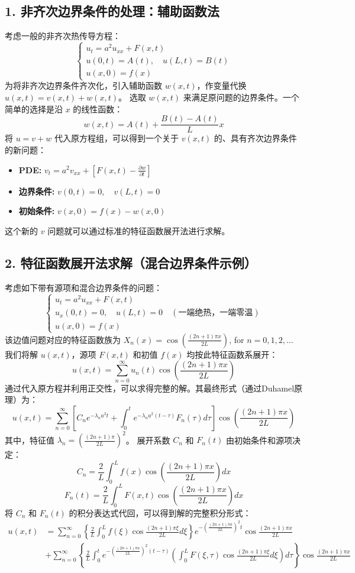 \documentclass{article}
\begin{document}
	\subsection*{1. 非齐次边界条件的处理：辅助函数法}
	考虑一般的非齐次热传导方程：
	\[
	\begin{cases}
		u_t = a^2 u_{xx} + F(x,t) \\
		u(0,t) = A(t), \quad u(L,t) = B(t) \\
		u(x,0) = f(x)
	\end{cases}
	\]
	为将非齐次边界条件齐次化，引入辅助函数 $w(x,t)$，作变量代换 $u(x,t) = v(x,t) + w(x,t)$。
	选取 $w(x,t)$ 来满足原问题的边界条件。一个简单的选择是沿 $x$ 的线性函数：
	\[
	w(x,t) = A(t) + \frac{B(t) - A(t)}{L} x
	\]
	将 $u = v+w$ 代入原方程组，可以得到一个关于 $v(x,t)$ 的、具有齐次边界条件的新问题：
	\begin{itemize}
		\item \textbf{PDE:} $v_t = a^2 v_{xx} + \left[ F(x,t) - \frac{\partial w}{\partial t} \right]$
		\item \textbf{边界条件:} $v(0,t) = 0, \quad v(L,t) = 0$
		\item \textbf{初始条件:} $v(x,0) = f(x) - w(x,0)$
	\end{itemize}
	这个新的 $v$ 问题就可以通过标准的特征函数展开法进行求解。
	
	\subsection*{2. 特征函数展开法求解（混合边界条件示例）}
	考虑如下带有源项和混合边界条件的问题：
	\[
	\begin{cases}
		u_t = a^2 u_{xx} + F(x,t) \\
		u_x(0,t) = 0, \quad u(L,t) = 0 \quad (\text{一端绝热，一端零温}) \\
		u(x,0) = f(x)
	\end{cases}
	\]
	该边值问题对应的特征函数族为 $X_n(x) = \cos\left(\frac{(2n+1)\pi x}{2L}\right)$, for $n=0, 1, 2, \dots$
	我们将解 $u(x,t)$，源项 $F(x,t)$ 和初值 $f(x)$ 均按此特征函数系展开：
	\[
	u(x,t) = \sum_{n=0}^{\infty} u_n(t) \cos\left(\frac{(2n+1)\pi x}{2L}\right)
	\]
	通过代入原方程并利用正交性，可以求得完整的解。其最终形式（通过Duhamel原理）为：
	\[
	u(x,t) = \sum_{n=0}^{\infty} \left[ C_n e^{- \lambda_n a^2 t} + \int_0^t e^{-\lambda_n a^2 (t-\tau)} F_n(\tau) d\tau \right] \cos\left(\frac{(2n+1)\pi x}{2L}\right)
	\]
	其中，特征值 $\lambda_n = \left(\frac{(2n+1)\pi}{2L}\right)^2$。
	展开系数 $C_n$ 和 $F_n(t)$ 由初始条件和源项决定：
	\[
	C_n = \frac{2}{L} \int_0^L f(x) \cos\left(\frac{(2n+1)\pi x}{2L}\right) dx
	\]
	\[
	F_n(t) = \frac{2}{L} \int_0^L F(x,t) \cos\left(\frac{(2n+1)\pi x}{2L}\right) dx
	\]
	将 $C_n$ 和 $F_n(t)$ 的积分表达式代回，可以得到解的完整积分形式：
	\begin{align*}
		u(x,t) &= \sum_{n=0}^{\infty} \left\{ \frac{2}{L} \int_0^L f(\xi) \cos\frac{(2n+1)\pi\xi}{2L} d\xi \right\} e^{-(\frac{(2n+1)\pi a}{2L})^2 t} \cos\frac{(2n+1)\pi x}{2L} \\
		&+ \sum_{n=0}^{\infty} \left\{ \frac{2}{L} \int_0^t e^{-(\frac{(2n+1)\pi a}{2L})^2(t-\tau)} \left( \int_0^L F(\xi,\tau) \cos\frac{(2n+1)\pi\xi}{2L} d\xi \right) d\tau \right\} \cos\frac{(2n+1)\pi x}{2L}
	\end{align*}
\end{document}
